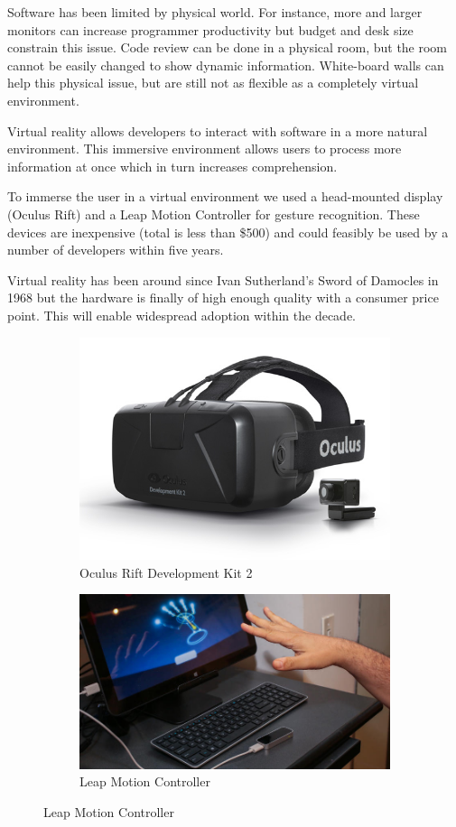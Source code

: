 \documentclass{acm_proc_article-sp}
\begin{document}
Software has been limited by physical world. For instance, more and larger monitors can increase programmer productivity but budget and desk size constrain this issue.
Code review can be done in a physical room, but the room cannot be easily changed to show dynamic information. White-board walls can help this physical issue, but are still not as flexible as a completely virtual environment.

Virtual reality allows developers to interact with software in a more natural environment. This immersive environment allows users to process more information at once which in turn increases comprehension.

To immerse the user in a virtual environment we used a head-mounted display (Oculus Rift) and a Leap Motion Controller for gesture recognition. These devices are inexpensive (total is less than \$500) and could feasibly be used by a number of developers within five years.

Virtual reality has been around since Ivan Sutherland's Sword of Damocles in 1968 but the hardware is finally of high enough quality with a consumer price point. This will enable widespread adoption within the decade.

\begin{figure}[ht!]
\centering
\begin{subfigure}{.5\columnwidth}
	\centering
	\includegraphics[width=.4\linewidth]{figures/dk2}
	\caption{Oculus Rift Development Kit 2 \label{fig:rift}}
\end{subfigure}%
\begin{subfigure}{.5\columnwidth}
  \centering
  \includegraphics[width=.4\linewidth]{figures/LeapAndKeyboard}
  \caption{Leap Motion Controller \label{fig:leap}}
\end{subfigure}
\end{figure}
\end{document}
